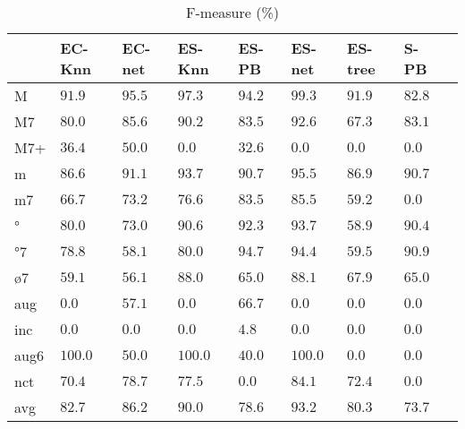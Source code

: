\documentclass{article}
\begin{document}
\begin{table}
  \centering
\begin{tabular}{l|p{0.5cm}p{0.5cm}p{0.5cm}p{0.5cm}p{0.5cm}p{0.5cm}p{0.5cm}p{0.5cm}}
     &      EC-Knn &      EC-net &      ES-Knn &       ES-PB &      ES-net &     ES-tree &      S-PB \\ \hline
M    & $     91.9$ & $     95.5$ & $     97.3$ & $     94.2$ & $     99.3$ & $     91.9$ & $     82.8$ \\
M7   & $     80.0$ & $     85.6$ & $     90.2$ & $     83.5$ & $     92.6$ & $     67.3$ & $     83.1$ \\
M7+  & $     36.4$ & $     50.0$ & $      0.0$ & $     32.6$ & $      0.0$ & $      0.0$ & $      0.0$ \\
m    & $     86.6$ & $     91.1$ & $     93.7$ & $     90.7$ & $     95.5$ & $     86.9$ & $     90.7$ \\
m7   & $     66.7$ & $     73.2$ & $     76.6$ & $     83.5$ & $     85.5$ & $     59.2$ & $      0.0$ \\
°    & $     80.0$ & $     73.0$ & $     90.6$ & $     92.3$ & $     93.7$ & $     58.9$ & $     90.4$ \\
°7   & $     78.8$ & $     58.1$ & $     80.0$ & $     94.7$ & $     94.4$ & $     59.5$ & $     90.9$ \\
ø7   & $     59.1$ & $     56.1$ & $     88.0$ & $     65.0$ & $     88.1$ & $     67.9$ & $     65.0$ \\
aug  & $      0.0$ & $     57.1$ & $      0.0$ & $     66.7$ & $      0.0$ & $      0.0$ & $      0.0$ \\
inc  & $      0.0$ & $      0.0$ & $      0.0$ & $      4.8$ & $      0.0$ & $      0.0$ & $      0.0$ \\
aug6 & $    100.0$ & $     50.0$ & $    100.0$ & $     40.0$ & $    100.0$ & $      0.0$ & $      0.0$ \\
nct  & $     70.4$ & $     78.7$ & $     77.5$ & $      0.0$ & $     84.1$ & $     72.4$ & $      0.0$ \\
avg  & $     82.7$ & $     86.2$ & $     90.0$ & $     78.6$ & $     93.2$ & $     80.3$ & $     73.7$ \\
\end{tabular}


  \caption{F-measure (\%)}
  \label{tab:f-measure}
\end{table}
\end{document}

